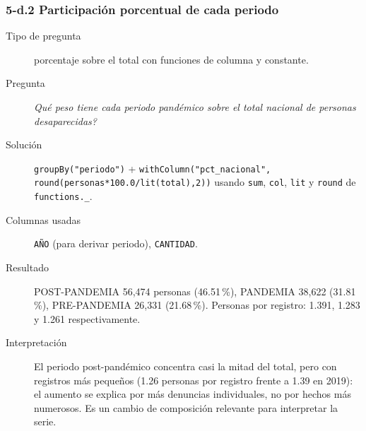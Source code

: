 \subsubsection*{5-d.2 \textbar{} Participaci\'on porcentual de cada periodo}
\begin{description}
\item[Tipo de pregunta] porcentaje sobre el total con funciones de columna y constante.
\item[Pregunta] \emph{Qu\'e peso tiene cada periodo pand\'emico sobre el total nacional de
      personas desaparecidas?}
\item[Soluci\'on] \texttt{groupBy("periodo")} + \texttt{withColumn("pct\_nacional",
      round(personas*100.0/lit(total),2))} usando \texttt{sum}, \texttt{col}, \texttt{lit} y
      \texttt{round} de \texttt{functions.\_}.
\item[Columnas usadas] \texttt{A\~NO} (para derivar periodo), \texttt{CANTIDAD}.
\item[Resultado] POST-PANDEMIA 56,474 personas (46.51\,\%), PANDEMIA 38,622 (31.81\,\%),
      PRE-PANDEMIA 26,331 (21.68\,\%). Personas por registro: 1.391, 1.283 y 1.261
      respectivamente.
\item[Interpretaci\'on] El periodo post-pand\'emico concentra casi la mitad del total, pero con
      registros m\'as peque\~nos (1.26 personas por registro frente a 1.39 en 2019): el aumento
      se explica por m\'as denuncias individuales, no por hechos m\'as numerosos. Es un cambio de
      composici\'on relevante para interpretar la serie.
\end{description}

